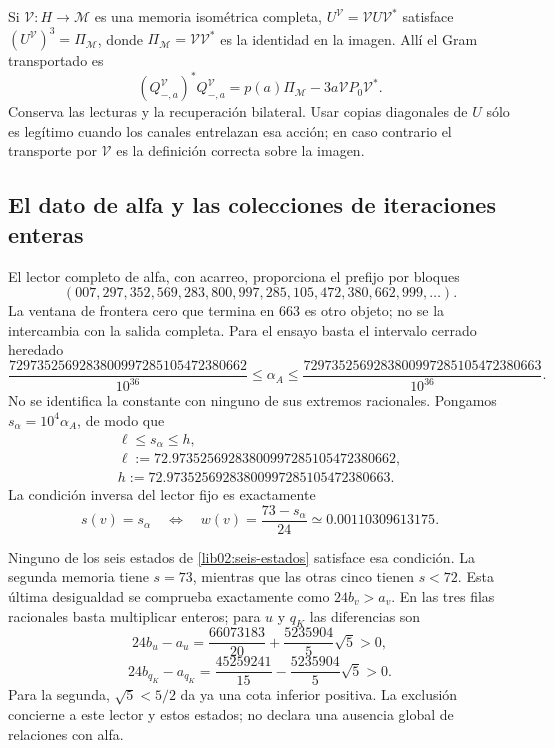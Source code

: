 Si \(\mathcal V:H\to\mathcal M\) es una memoria isométrica
completa, \(U^{\mathcal V}=\mathcal VU\mathcal V^*\) satisface
\((U^{\mathcal V})^3=\Pi_{\mathcal M}\), donde
\(\Pi_{\mathcal M}=\mathcal V\mathcal V^*\) es la identidad en
la imagen. Allí el Gram transportado es
\[
 (Q_{-,a}^{\mathcal V})^*Q_{-,a}^{\mathcal V}
 =p(a)\Pi_{\mathcal M}-3a\mathcal VP_0\mathcal V^*.
\]
Conserva las lecturas y la recuperación bilateral. Usar copias diagonales
de \(U\) sólo es legítimo cuando los canales entrelazan esa acción;
en caso contrario el transporte por \(\mathcal V\) es la definición
correcta sobre la imagen.

\subsection{El dato de alfa y las colecciones de iteraciones enteras}
\label{lib02:ensayo-inverso}

El lector completo de alfa, con acarreo, proporciona el prefijo por
bloques
\[
 (007,297,352,569,283,800,997,285,105,472,380,662,999,\ldots).
\]
La ventana de frontera cero que termina en 663 es otro objeto; no se la
intercambia con la salida completa. Para el ensayo basta el intervalo
cerrado heredado
\begin{equation}
 \frac{7297352569283800997285105472380662}{10^{36}}
 \leq\alpha_A\leq
 \frac{7297352569283800997285105472380663}{10^{36}}.
 \label{lib02:intervalo-alpha}
\end{equation}
No se identifica la constante con ninguno de sus extremos racionales.
Pongamos \(s_\alpha=10^4\alpha_A\), de modo que
\begin{equation}
 \begin{gathered}
 \ell\leq s_\alpha\leq h,\\
 \ell:=72.97352569283800997285105472380662,\\
 h:=72.97352569283800997285105472380663.
 \end{gathered}
 \label{lib02:intervalo-s}
\end{equation}
La condición inversa del lector fijo es exactamente
\begin{equation}
 s(v)=s_\alpha
 \quad\Longleftrightarrow\quad
 w(v)=\frac{73-s_\alpha}{24}
 \simeq0.00110309613175.
 \label{lib02:criterio-alpha}
\end{equation}

Ninguno de los seis estados de \cref{lib02:seis-estados} satisface esa
condición. La segunda memoria tiene \(s=73\), mientras que las otras
cinco tienen \(s<72\). Esta última desigualdad se comprueba exactamente
como \(24b_v>a_v\). En las tres filas racionales basta multiplicar
enteros; para \(u\) y \(q_K\) las diferencias son
\[
 24b_u-a_u=\frac{66073183}{20}+\frac{5235904}{5}\sqrt5>0,
\]
\[
 24b_{q_K}-a_{q_K}
 =\frac{45259241}{15}-\frac{5235904}{5}\sqrt5>0.
\]
Para la segunda, \(\sqrt5<5/2\) da ya una cota inferior positiva.
La exclusión concierne a este lector y estos estados; no declara una
ausencia global de relaciones con alfa.

